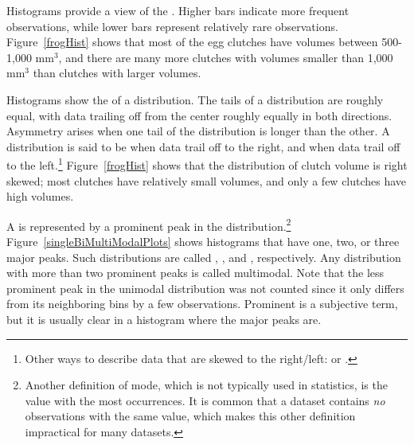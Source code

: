 Histograms provide a view of the . Higher bars indicate more frequent observations, while lower bars represent relatively rare observations. Figure~\ref{frogHist} shows that most of the egg clutches have volumes between 500-1,000 mm$^3$, and there are many more clutches with volumes smaller than 1,000 mm$^{3}$ than clutches with larger volumes. 

Histograms show the  of a distribution\label{shapeFirstDiscussed}. The tails of a  distribution are roughly equal, with data trailing off from the center roughly equally in both directions. Asymmetry arises when one tail of the distribution is longer than the other. A distribution is said to be  when data trail off to the right, and  when data trail off to the left.\footnote{Other ways to describe data that are skewed to the right/left:  or .} Figure~\ref{frogHist} shows that the distribution of clutch volume is right skewed; most clutches have relatively small volumes, and only a few clutches have high volumes. 

A  is represented by a prominent peak in the distribution.\footnote{Another definition of mode, which is not typically used in statistics, is the value with the most occurrences. It is common that a dataset contains \emph{no} observations with the same value, which makes this other definition impractical for many datasets.} Figure~\ref{singleBiMultiModalPlots} shows histograms that have one, two, or three major peaks. Such distributions are called , , and , respectively. Any distribution with more than two prominent peaks is called multimodal. Note that the less prominent peak in the unimodal distribution was not counted since it only differs from its neighboring bins by a few observations. Prominent is a subjective term, but it is usually clear in a histogram where the major peaks are.  


